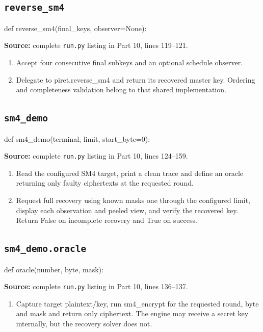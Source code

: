 \subsection{\texttt{reverse\_\allowbreak{}sm4}}
\begin{lightcode}
def reverse_sm4(final_keys, observer=None):
\end{lightcode}
\noindent\textbf{Source:} complete \texttt{run.py} listing in Part 10, lines 119--121.
\begin{enumerate}
\item Accept four consecutive final subkeys and an optional schedule observer.
\item Delegate to piret.reverse\_sm4 and return its recovered master key. Ordering and completeness validation belong to that shared implementation.
\end{enumerate}
\subsection{\texttt{sm4\_\allowbreak{}demo}}
\begin{lightcode}
def sm4_demo(terminal, limit, start_byte=0):
\end{lightcode}
\noindent\textbf{Source:} complete \texttt{run.py} listing in Part 10, lines 124--159.
\begin{enumerate}
\item Read the configured SM4 target, print a clean trace and define an oracle returning only faulty ciphertexts at the requested round.
\item Request full recovery using known masks one through the configured limit, display each observation and peeled view, and verify the recovered key. Return False on incomplete recovery and True on success.
\end{enumerate}
\subsection{\texttt{sm4\_\allowbreak{}demo.oracle}}
\begin{lightcode}
def oracle(number, byte, mask):
\end{lightcode}
\noindent\textbf{Source:} complete \texttt{run.py} listing in Part 10, lines 136--137.
\begin{enumerate}
\item Capture target plaintext/key, run sm4\_encrypt for the requested round, byte and mask and return only ciphertext. The engine may receive a secret key internally, but the recovery solver does not.
\end{enumerate}
